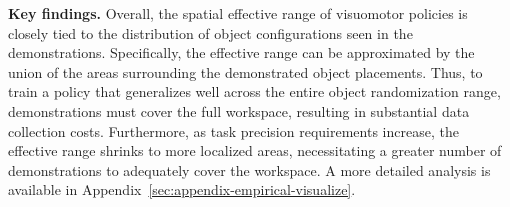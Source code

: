 \vspace{0.2cm} \noindent\textbf{Key findings.}
Overall, the spatial effective range of visuomotor policies is closely tied to the distribution of object configurations seen in the demonstrations. Specifically, the effective range can be approximated by the union of the areas surrounding the demonstrated object placements. Thus, to train a policy that generalizes well across the entire object randomization range, demonstrations must cover the full workspace, resulting in substantial data collection costs. Furthermore, as task precision requirements increase, the effective range shrinks to more localized areas, necessitating a greater number of demonstrations to adequately cover the workspace.
A more detailed analysis is available in Appendix~\ref{sec:appendix-empirical-visualize}.








